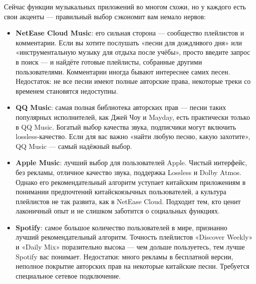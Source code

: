 


Сейчас функции музыкальных приложений во многом схожи, но у каждого есть свои акценты — правильный выбор сэкономит вам немало нервов:

\begin{itemize}
  \item \textbf{NetEase Cloud Music}: его сильная сторона — сообщество плейлистов и комментарии. Если вы хотите послушать «песни для дождливого дня» или «инструментальную музыку для отдыха после учёбы», просто введите запрос в поиск — и найдёте готовые плейлисты, собранные другими пользователями. Комментарии иногда бывают интереснее самих песен. Недостаток: не все песни имеют полные авторские права, некоторые треки со временем становятся недоступны.
  \item \textbf{QQ Music}: самая полная библиотека авторских прав — песни таких популярных исполнителей, как Джей Чоу и Mayday, есть практически только в QQ Music. Богатый выбор качества звука, подписчики могут включить lossless-качество. Если для вас важно «найти любую песню, какую захотите», QQ Music — самый надёжный выбор.
  \item \textbf{Apple Music}: лучший выбор для пользователей Apple. Чистый интерфейс, без рекламы, отличное качество звука, поддержка Lossless и Dolby Atmos. Однако его рекомендательный алгоритм уступает китайским приложениям в понимании предпочтений китайскоязычных пользователей, а культура плейлистов не так развита, как в NetEase Cloud. Подходит тем, кто ценит лаконичный опыт и не слишком заботится о социальных функциях.
  \item \textbf{Spotify}: самое большое количество пользователей в мире, признанно лучший рекомендательный алгоритм. Точность плейлистов «Discover Weekly» и «Daily Mix» поразительно высока — чем дольше пользуетесь, тем лучше Spotify вас понимает. Недостатки: много рекламы в бесплатной версии, неполное покрытие авторских прав на некоторые китайские песни. Требуется специальное сетевое подключение.
\end{itemize}

